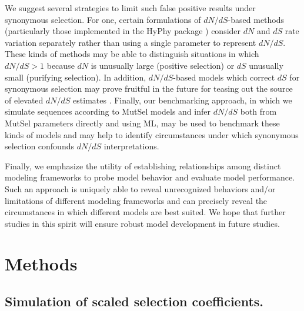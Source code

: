 \documentclass[11pt]{article}
\begin{document}
We suggest several strategies to limit such false positive results under synonymous selection. For one, certain formulations of $dN/dS$-based methods (particularly those implemented in the HyPhy package \citep{KosakovskyPondetal2005}) consider $dN$ and $dS$ rate variation separately \citep{MuseGaut1994,KosakovskyPondMuse2005,Murrell2013} rather than using a single parameter to represent $dN/dS$. These kinds of methods may be able to distinguish situations in which $dN/dS>1$ because $dN$ is unusually large (positive selection) or $dS$ unusually small (purifying selection). In addition, $dN/dS$-based models which correct $dS$ for synonymous selection may prove fruitful in the future for teasing out the source of elevated $dN/dS$ estimates \citep{Zhouetal2010}. Finally, our benchmarking approach, in which we simulate sequences according to MutSel models and infer $dN/dS$ both from MutSel parameters directly and using ML, may be used to benchmark these kinds of models and may help to identify circumstances under which synonymous selection confounds $dN/dS$ interpretations. 

Finally, we emphasize the utility of establishing relationships among distinct modeling frameworks to probe model behavior and evaluate model performance. Such an approach is uniquely able to reveal unrecognized behaviors and/or limitations of different modeling frameworks and can precisely reveal the circumstances in which different models are best suited. We hope that further studies in this spirit will ensure robust model development in future studies.


\section*{Methods}

\subsection*{Simulation of scaled selection coefficients.}
\end{document}
